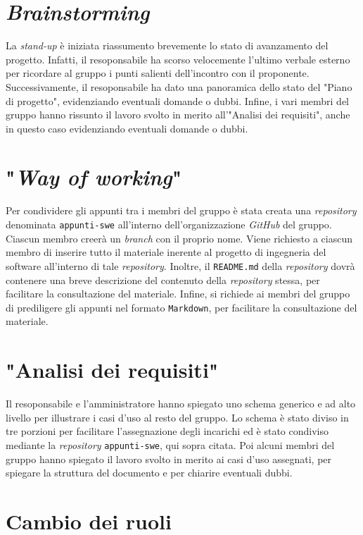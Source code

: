 \section{\textit{Brainstorming}}

La \textit{stand-up} è iniziata riassumento brevemente lo stato di avanzamento
del progetto. Infatti, il resoponsabile ha scorso velocemente l'ultimo verbale
esterno per ricordare al gruppo i punti salienti dell'incontro con il
proponente. Successivamente, il resoponsabile ha dato una panoramica dello stato del
"Piano di progetto", evidenziando eventuali domande o dubbi. Infine, i vari
membri del gruppo hanno rissunto il lavoro svolto in merito all'"Analisi dei
requisiti", anche in questo caso evidenziando eventuali domande o dubbi.

\section{"\textit{Way of working}"}

Per condividere gli appunti tra i membri del gruppo è stata creata una
\textit{repository} denominata \texttt{appunti-swe} all'interno
dell'organizzazione \textit{GitHub} del gruppo. Ciascun membro creerà un
\textit{branch} con il proprio nome. Viene richiesto a ciascun membro di
inserire tutto il materiale inerente al progetto di ingegneria del software
all'interno di tale \textit{repository}. Inoltre, il \texttt{README.md} della
\textit{repository} dovrà contenere una breve descrizione del contenuto della
\textit{repository} stessa, per facilitare la consultazione del materiale.
Infine, si richiede ai membri del gruppo di prediligere gli appunti nel formato
\texttt{Markdown}, per facilitare la consultazione del materiale.

\section{"Analisi dei requisiti"}

Il resoponsabile e l'amministratore hanno spiegato uno schema
generico e ad alto livello per illustrare i casi d'uso al resto del gruppo. Lo
schema è stato diviso in tre porzioni per facilitare l'assegnazione degli
incarichi ed è stato condiviso mediante la \textit{repository}
\texttt{appunti-swe}, qui sopra citata. Poi alcuni membri del gruppo hanno
spiegato il lavoro svolto in merito ai casi d'uso assegnati, per spiegare la
struttura del documento e per chiarire eventuali dubbi.

\section{Cambio dei ruoli}

